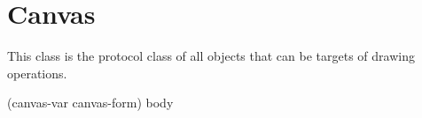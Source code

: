 \chapter{Canvas}
\label{chap-canvas}


This class is the protocol class of all objects that can be targets of
drawing operations.

 {(canvas-var canvas-form) \body body}
